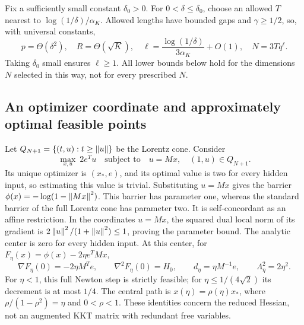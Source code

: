 Fix a sufficiently small constant $\delta_0>0$.  For
$0<\delta\leq\delta_0$, choose an allowed $T$ nearest to
$\log(1/\delta)/\alpha_K$.  Allowed lengths have bounded gaps and
$\gamma\geq1/2$, so, with universal constants,
\begin{equation}\label{eq:scalar-clock-parameters}
 p=\Theta(\delta^2),\quad R=\Theta(\sqrt K),\quad
 \ell=\frac{\log(1/\delta)}{3\alpha_K}+O(1),\quad
 N=3Tq^\ell.
\end{equation}
Taking $\delta_0$ small ensures $\ell\geq1$.  All lower bounds below
hold for the dimensions $N$ selected in this way, not for every
prescribed $N$.

\subsection{An optimizer coordinate and approximately optimal feasible points}

Let $Q_{N+1}=\{(t,u):t\geq\left\lVert u\right\rVert\}$ be the Lorentz cone.  Consider
\begin{equation}\label{eq:one-cone-program}
 \max_{x,u}\ 2e^Tu
 \quad\text{subject to}\quad u=Mx,\quad(1,u)\in Q_{N+1}.
\end{equation}
Its unique optimizer is $(x_*,e)$, and its optimal value is two for every
hidden input, so estimating this value is trivial.  Substituting $u=Mx$ gives the barrier
$\phi(x)=-\log(1-\left\lVert Mx\right\rVert^2)$.  This barrier has parameter one, whereas
the standard barrier of the full Lorentz cone has parameter two.  It is self-concordant as an affine restriction.  In the coordinates $u=Mx$, the
squared dual local norm of its gradient is
$2\left\lVert u\right\rVert^2/(1+\left\lVert u\right\rVert^2)\leq1$, proving the parameter bound.
The analytic center is zero for every hidden input.  At this center, for
$F_\eta(x)=\phi(x)-2\eta e^TMx$,
\begin{equation}\label{eq:first-newton}
 \nabla F_\eta(0)=-2\eta M^Te,\qquad
 \nabla^2 F_\eta(0)=H_0,\qquad
 d_\eta=\eta M^{-1}e,\qquad \Lambda_\eta^2=2\eta^2.
\end{equation}
For $\eta<1$, this full Newton step is strictly feasible; for
$\eta\leq1/(4\sqrt2)$ its decrement is at most $1/4$.
The central path is
$x(\eta)=\rho(\eta)x_*$, where
$\rho/(1-\rho^2)=\eta$ and $0<\rho<1$.
These identities concern the reduced Hessian, not an augmented KKT
matrix with redundant free variables.


